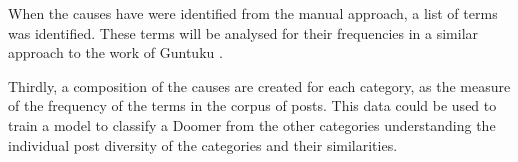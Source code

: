 \documentclass[../report.tex]{subfiles}
\begin{document}
When the causes have were identified from the manual approach, a list of terms was identified.
These terms will be analysed for their frequencies in a similar approach to the work of Guntuku \cite{twitter_loneliness}.

Thirdly, a composition of the causes are created for each category, as the measure of the frequency of the terms in the corpus of posts.
This data could be used to train a model to classify a Doomer from the other categories understanding the individual post diversity of the categories and their similarities.
\end{document}
